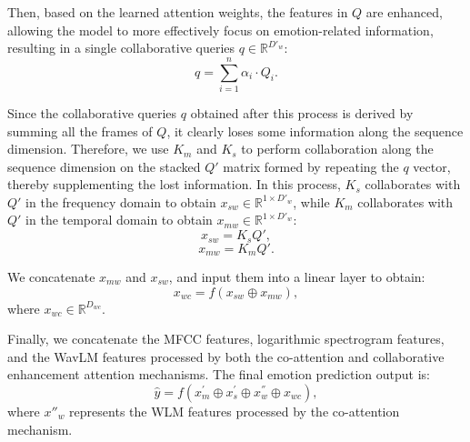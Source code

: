 \documentclass[runningheads]{llncs}
\begin{document}
Then, based on the learned attention weights, the features in \( Q \) are enhanced, allowing the model to more effectively focus on emotion-related information, resulting in a single collaborative queries \(q\in \mathbb{R}^{D'_w}\):
\begin{equation}
q=\sum_{i=1}^{n}\alpha_{i} \cdot Q_i.
\end{equation}

Since the collaborative queries \( q \) obtained after this process is derived by summing all the frames of \( Q \), it clearly loses some information along the sequence dimension. Therefore, we use \( K_m \) and \( K_s \) to perform collaboration along the sequence dimension on the stacked \( Q' \) matrix formed by repeating the \( q \) vector, thereby supplementing the lost information. In this process, \( K_s \) collaborates with \( Q' \) in the frequency domain to obtain \( x_{sw}\in \mathbb{R}^{1\times {D'_w}} \), while \( K_m \) collaborates with \( Q' \) in the temporal domain to obtain \( x_{mw}\in \mathbb{R}^{1\times {D'_w}} \):
\begin{equation}
x_{sw}=K_{s} Q',
\end{equation}
\begin{equation}
x_{mw}=K_{m} Q'.
\end{equation}

We concatenate \( x_{mw} \) and \( x_{sw} \), and input them into a linear layer to obtain:
\begin{equation}
x_{wc}=f(x_{sw}\oplus x_{mw}),
\end{equation}
where \(x_{wc}\in \mathbb{R}^{D_{wc}}\).

Finally, we concatenate the MFCC features, logarithmic spectrogram features, and the WavLM features processed by both the co-attention and collaborative enhancement attention mechanisms. The final emotion prediction output is:
\begin{equation}
\hat{y}=f(x^{'}_{m}\oplus x^{'}_{s}\oplus x^{''}_{w}\oplus x_{wc}), 
\end{equation}
where \( x''_w \) represents the WLM features processed by the co-attention mechanism.
\end{document}
